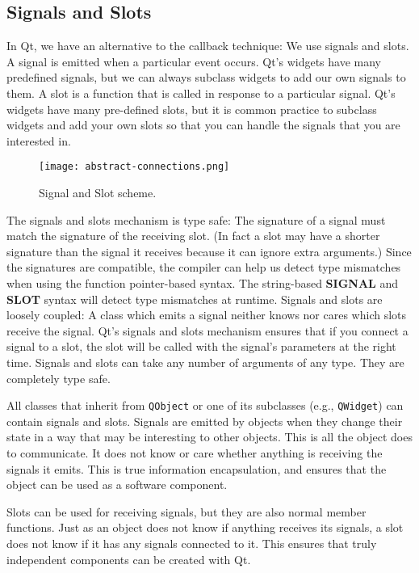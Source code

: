 \subsection{Signals and Slots}
\label{ssec:soft-sig-solt-detail}
In Qt, we have an alternative to the callback technique: We use signals and
slots. A signal is emitted when a particular event occurs. Qt's widgets have
many predefined signals, but we can always subclass widgets to add our own
signals to them. A slot is a function that is called in response to a particular
signal. Qt's widgets have many pre-defined slots, but it is common practice to
subclass widgets and add your own slots so that you can handle the signals that
you are interested in. 
%
%
\begin{figure}[htb]
	\centering
	\texttt{[image: abstract-connections.png]}
	\caption{Signal and Slot scheme.}
	\label{fig:software-signal-slots-scheme}
\end{figure}
%
The signals and slots mechanism is type safe: The signature of a signal must
match the signature of the receiving slot. (In fact a slot may have a shorter
signature than the signal it receives because it can ignore extra arguments.)
Since the signatures are compatible, the compiler can help us detect type
mismatches when using the function pointer-based syntax. The string-based
\textbf{SIGNAL} and \textbf{SLOT} syntax will detect type mismatches at runtime.
Signals and slots are loosely coupled: A class which emits a signal neither
knows nor cares which slots receive the signal. Qt's signals and slots mechanism
ensures that if you connect a signal to a slot, the slot will be called with the
signal's parameters at the right time. Signals and slots can take any number of
arguments of any type. They are completely type safe.

All classes that inherit from \texttt{QObject} or one of its subclasses (e.g.,
\texttt{QWidget}) can contain signals and slots. Signals are emitted by objects
when they change their state in a way that may be interesting to other objects.
This is all the object does to communicate. It does not know or care whether
anything is receiving the signals it emits. This is true information
encapsulation, and ensures that the object can be used as a software component.

Slots can be used for receiving signals, but they are also normal member
functions. Just as an object does not know if anything receives its signals, a
slot does not know if it has any signals connected to it. This ensures that
truly independent components can be created with Qt.

